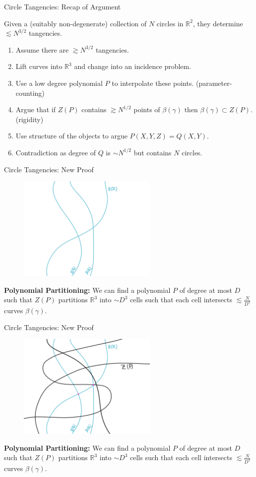 \documentclass{beamer}
\newcommand{\RR}{\mathbb R}
\newcommand{\nfr}[1]{\begin{frame} #1
\end{frame}}
\begin{document}
\nfr{{Circle Tangencies: Recap of Argument}
\begin{theorem}
    Given a (suitably non-degenerate) collection of $N$ circles in $\RR^2$, they determine $\lesssim N^{3/2}$ tangencies.
\end{theorem}
\begin{enumerate}
    \item Assume there are $\gtrsim N^{3/2}$ tangencies.
    \item Lift curves into $\RR^3$ and change into an incidence problem.
    \item Use a low degree polynomial $P$ to interpolate these points. (parameter-counting)
    \item Argue that if $Z(P)$ contains $\gtrsim N^{1/2}$ points of $\beta(\gamma)$ then $\beta(\gamma) \subset Z(P)$. (rigidity)
    \item Use structure of the objects to argue $P(X,Y,Z) = Q(X,Y)$.
    \item Contradiction as degree of $Q$ is $\sim N^{1/2}$ but contains $N$ circles.
\end{enumerate}
}

\nfr{{Circle Tangencies: New Proof }
\begin{figure}[h]
    \centering
    \includegraphics[width=0.6\textwidth]{images/new_proof_a.png}
\end{figure}
\textbf{Polynomial Partitioning:} We can find a polynomial $P$ of degree at most $D$ such that $Z(P)$ partitions $\RR^3$ into $\sim D^3$ cells such that each cell intersects $\lesssim \frac{N}{D^2}$ curves $\beta(\gamma)$.
}


\nfr{{Circle Tangencies: New Proof }
\begin{figure}[h]
    \centering
    \includegraphics[width=0.6\textwidth]{images/new_proof_b.png}
\end{figure}
\textbf{Polynomial Partitioning:} We can find a polynomial $P$ of degree at most $D$ such that $Z(P)$ partitions $\RR^3$ into $\sim D^3$ cells such that each cell intersects $\lesssim \frac{N}{D^2}$ curves $\beta(\gamma)$.
}
\end{document}
